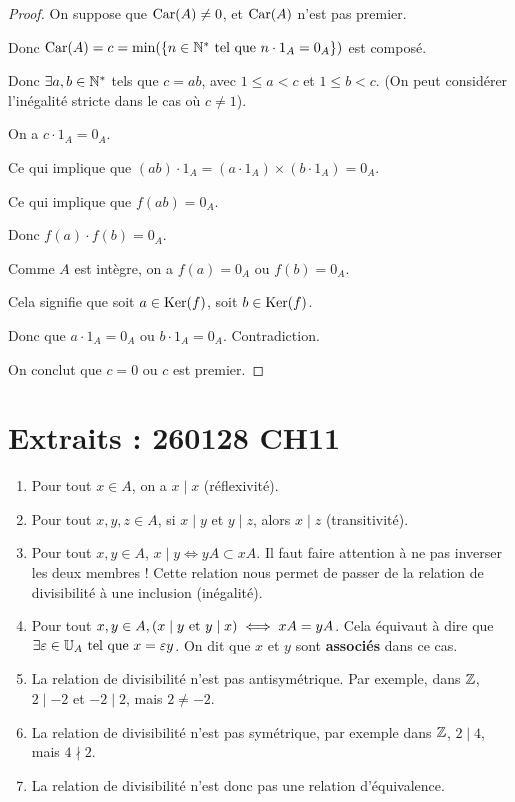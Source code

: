 \documentclass[12pt,a4paper]{report}
\begin{document}
\begin{proof}
    On suppose que $\mathrm{Car}(A) \ne 0$, et $\mathrm{Car}(A)$ n'est pas premier.

    Donc $\mathrm{Car}(A) = c = \min(\{n\in\mathbb{N}^*\text{ tel que } n\cdot1_A = 0_A\})$ est composé.

    Donc $\exists a,b \in \mathbb{N}^*$ tels que $c = a b$, avec $1 \le a < c$ et $1 \le b < c$. (On peut considérer l'inégalité stricte dans le cas où $c\ne 1$).

    On a $c\cdot 1_A = 0_A$.

    Ce qui implique que $(a b)\cdot 1_A = (a\cdot 1_A) \times (b\cdot 1_A) = 0_A$.

    Ce qui implique que $f(ab)=0_A$.
    
    Donc $f(a)\cdot f(b) = 0_A$.

    Comme $A$ est intègre, on a $f(a) = 0_A$ ou $f(b) = 0_A$.

    Cela signifie que soit $a \in \mathrm{Ker}(f)$, soit $b \in \mathrm{Ker}(f)$.

    Donc que $a\cdot 1_A = 0_A$ ou $b \cdot 1_A = 0_A$. Contradiction.

    On conclut que $c=0$ ou $c$ est premier.
\end{proof}


\vspace{1em}


\section*{Extraits : 260128 CH11}


\begin{property}
    \label{property:divisibilite}
    \begin{enumerate}
        \item Pour tout $x\in A$, on a $x\mid x$ (réflexivité).
        \item Pour tout $x,y,z \in A$, si $x\mid y$ et $y\mid z$, alors $x\mid z$ (transitivité).
        \item Pour tout $x,y\in A$, $x\mid y \iff yA \subset xA$. Il faut faire attention à ne pas inverser les deux membres ! Cette relation nous permet de passer de la relation de divisibilité à une inclusion (inégalité).
        \item Pour tout $x,y \in A, (x\mid y \text{ et } y \mid x) \iff xA = yA$. Cela équivaut à dire que $\exists \varepsilon \in \mathbb{U}_A \text{ tel que } x = \varepsilon y$. On dit que $x$ et $y$ sont \textbf{associés} dans ce cas.
        \item La relation de divisibilité n'est pas antisymétrique. Par exemple, dans $\mathbb{Z}$, $2\mid -2$ et $-2\mid 2$, mais $2 \neq -2$.
        \item La relation de divisibilité n'est pas symétrique, par exemple dans $\mathbb{Z}$, $2\mid 4$, mais $4 \nmid 2$.
        \item La relation de divisibilité n'est donc pas une relation d'équivalence.
    \end{enumerate}
\end{property}
\end{document}
